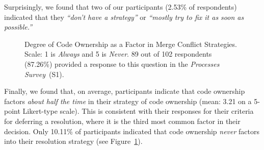 Surprisingly, we found that two of our participants (2.53\% of respondents) indicated that they \textit{``don't have a strategy''} or \textit{``mostly try to fix it as soon as possible.''}

\begin{figure}[!htbp]
\centering
{}
\caption{Degree of Code Ownership as a Factor in Merge Conflict Strategies. Scale: 1 is \textit{Always} and 5 is \textit{Never}. 89 out of 102 respondents (87.26\%) provided a response to this question in the \textit{Processes Survey}~(S1).\vspace*{-0.3\baselineskip}}
\label{fig:code-ownership-resolution}
\end{figure}


Finally, we found that, on average, participants indicate that code ownership factors \textit{about half the time} in their strategy of code ownership (mean: 3.21 on a 5-point Likert-type scale).
This is consistent with their responses for their criteria for deferring a resolution, where it is the third most common factor in their decision. 
Only 10.11\% of participants indicated that code ownership \textit{never} factors into their resolution strategy (see Figure~\ref{fig:code-ownership-resolution}).

